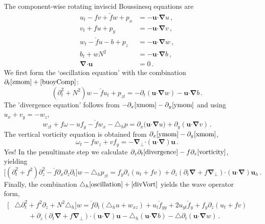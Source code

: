 \documentclass[12pt, oneside]{article}
\newcommand{\com}{\, ,}
\newcommand{\per}{\, .}
\newcommand{\beq}{\begin{equation}}
\newcommand{\eeq}{\end{equation}}
\newcommand{\p}{\partial}
\newcommand{\bnabla}{\boldsymbol \nabla}
\newcommand{\pnabla}{\boldsymbol \nabla_{\! \! \perp}}
\newcommand{\bcdot}{\boldsymbol \cdot}
\newcommand{\hlap}{\triangle_h}
\newcommand{\lap}{\triangle}
\newcommand{\bu}{\boldsymbol u}
\newcommand{\buh}{\boldsymbol u_h}
\newcommand{\fh}{\breve f}
\begin{document}
The component-wise rotating inviscid Boussinesq equations are
\begin{align}
u_t - f v + \fh w + p_x &= - \bu \bcdot \bnabla u \com \label{xmom} \\
v_t + f u + p_y &= - \bu \bcdot \bnabla v \com \label{ymom} \\
w_t - \fh u - b + p_z &= - \bu \bcdot \bnabla w \com \label{zmom} \\
b_t + w N^2 &= - \bu \bcdot \bnabla b \com \label{buoyComp} \\
\bnabla \bcdot \bu &= 0 \label{contComp} \per
\end{align}
We first form the `oscillation equation' with the combination $\p_t \eqref{zmom} + \eqref{buoyComp}$:
\beq
\left ( \p_t^2 + N^2 \right ) w - \fh u_t + p_{zt} = - \p_t \left ( \bu \bcdot \bnabla w \right ) - \bu \bcdot \bnabla b \per 
\label{oscillation}
\eeq
The 'divergence equation' follows from $- \p_x \eqref{xmom}- \p_y \eqref{ymom}$ and using $u_x + v_y = - w_z$, 
\beq
w_{zt} + f \omega - u f_y  -  \fh w_x - \hlap p =  \p_x \big ( \bu \bcdot \bnabla u \big ) + \p_y \left ( \bu \bcdot \bnabla v \right ) \per
\label{divergence}
\eeq
The vertical vorticity equation is obtained from $\p_x \eqref{ymom} - \p_y \eqref{xmom}$, 
\beq
\omega_t - f w_z + v f_y = - \pnabla \bcdot \left ( \bu \bcdot \bnabla \right ) \bu \per
\label{vorticity}
\eeq
Yes! In the penultimate step we calculate $\p_z \p_t \eqref{divergence} - f \p_z \eqref{vorticity}$, yielding
\beq
\Big [  \left ( \p_t^2 + f^2 \right ) \p_z^2 - \fh \p_x \p_z \p_t \Big ] w - \hlap p_{zt} = f_y \p_z \left ( u_t + f v \right ) + \p_z \left ( \p_t \bnabla + f \pnabla \right ) \bcdot \left ( \bu \bcdot \bnabla \right ) \buh \per
\label{divVort}
\eeq
Finally, the combination $\hlap \eqref{oscillation} + \eqref{divVort}$ yields the wave operator form,
\beq
\begin{split}
\Big [&  \lap \p_t^2 + f^2 \p_z + N^2 \hlap \Big ] w = \fh \p_t \left ( \hlap u + w_{xz} \right ) + u_t \fh_{yy} + 2 u_{yt} \fh_{y}  + f_y \p_z \left ( u_t + f v \right ) \\
& \qquad  + \p_z \left ( \p_t \bnabla + f \pnabla \right ) \bcdot \left ( \bu \bcdot \bnabla \right ) \bu - \hlap \left ( \bu \bcdot \bnabla b \right ) - \lap \p_t \left ( \bu \bcdot \bnabla w \right ) \per
\end{split}
\label{waveOperatorEqn}
\eeq



\end{document}
